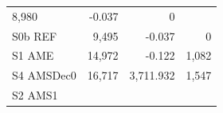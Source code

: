 \documentclass[]{article}
\begin{document}
\begin{longtable}[]{@{}lrrr@{}}
\begin{minipage}[t]{0.21\columnwidth}
8,980\strut
\end{minipage} & \begin{minipage}[t]{0.20\columnwidth}\raggedleft\strut
-0.037\strut
\end{minipage} & \begin{minipage}[t]{0.09\columnwidth}\raggedleft\strut
0\strut
\end{minipage}\tabularnewline
\begin{minipage}[t]{0.16\columnwidth}\raggedright\strut
S0b REF\strut
\end{minipage} & \begin{minipage}[t]{0.21\columnwidth}\raggedleft\strut
9,495\strut
\end{minipage} & \begin{minipage}[t]{0.20\columnwidth}\raggedleft\strut
-0.037\strut
\end{minipage} & \begin{minipage}[t]{0.09\columnwidth}\raggedleft\strut
0\strut
\end{minipage}\tabularnewline
\begin{minipage}[t]{0.16\columnwidth}\raggedright\strut
S1 AME\strut
\end{minipage} & \begin{minipage}[t]{0.21\columnwidth}\raggedleft\strut
14,972\strut
\end{minipage} & \begin{minipage}[t]{0.20\columnwidth}\raggedleft\strut
-0.122\strut
\end{minipage} & \begin{minipage}[t]{0.09\columnwidth}\raggedleft\strut
1,082\strut
\end{minipage}\tabularnewline
\begin{minipage}[t]{0.16\columnwidth}\raggedright\strut
S4 AMSDec0\strut
\end{minipage} & \begin{minipage}[t]{0.21\columnwidth}\raggedleft\strut
16,717\strut
\end{minipage} & \begin{minipage}[t]{0.20\columnwidth}\raggedleft\strut
3,711.932\strut
\end{minipage} & \begin{minipage}[t]{0.09\columnwidth}\raggedleft\strut
1,547\strut
\end{minipage}\tabularnewline
\begin{minipage}[t]{0.16\columnwidth}\raggedright\strut
S2 AMS1\strut
\end{minipage} & \begin{minipage}[t]{0.21\columnwidth}\raggedleft\strut

\end{minipage}
\end{longtable}
\end{document}
